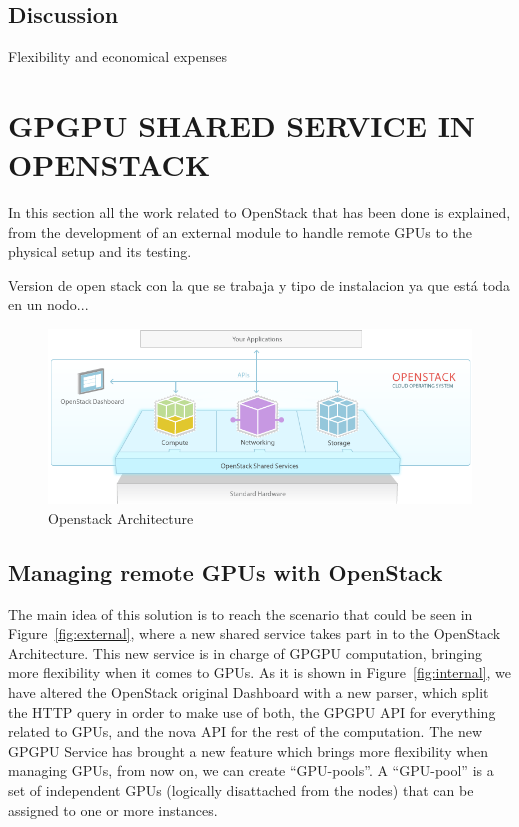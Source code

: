 \documentclass[a4paper,twoside]{article}
\begin{document}
\subsection{Discussion}
Flexibility and economical expenses

\section{\uppercase{GPGPU Shared Service in OpenStack}}
In this section all the work related to OpenStack that has been done is explained, from the development of an external module to handle remote GPUs to the physical setup and its testing.

Version de open stack con la que se trabaja y tipo de instalacion ya que está toda en un nodo...

\begin{figure}[htb]
  \centering
  \includegraphics[width=\linewidth]{images/os-orig.png}
  \caption{Openstack Architecture}
  \label{fig:os-orig}
\end{figure}

\subsection{Managing remote GPUs with OpenStack}
The main idea of this solution is to reach the scenario that could be seen in Figure~\ref{fig:external}, where a new shared service takes part in to the OpenStack Architecture.
This new service is in charge of GPGPU computation, bringing more flexibility when it comes to GPUs.
As it is shown in Figure~\ref{fig:internal}, we have altered the OpenStack original Dashboard with a new parser, 
which split the HTTP query in order to make use of both, the GPGPU API for everything related to GPUs, and the nova API for the rest of the computation. 
The new GPGPU Service has brought a new feature which brings more flexibility when managing GPUs, from now on, we can create ``GPU-pools''. 
A ``GPU-pool'' is a set of independent GPUs (logically disattached from the nodes) that can be assigned to one or more instances.
\end{document}
